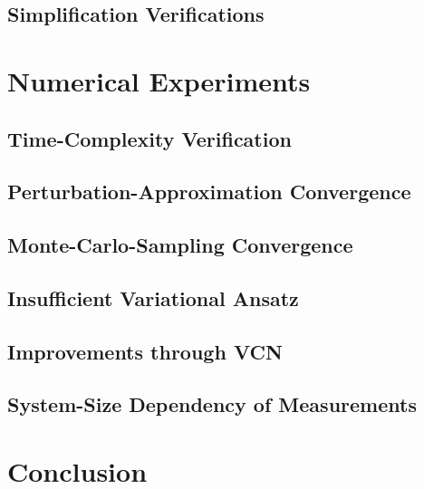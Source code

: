 \documentclass[
headings=optiontohead,              %
12pt,                               %
DIV=13,                             %
twoside=false,                      %
open=right,                         %
BCOR=00mm,                          %
toc=bibliographynumbered            %
]{scrreport}
\begin{document}
    \section{Simplification Verifications}
    \label{sec:implementation-details-simplification-verifications}
    
    \FloatBarrier

\chapter{Numerical Experiments}
\label{sec:experiments-numerical}

\FloatBarrier

    \section{Time-Complexity Verification}
    \label{sec:experiments-time-complexity}
    
    \FloatBarrier

    \section{Perturbation-Approximation Convergence}
    \label{sec:experiments-perturbation-convergence}
    
    \FloatBarrier

    \section{Monte-Carlo-Sampling Convergence}
    \label{sec:experiments-mc-convergence}
    
    \FloatBarrier

    \section{Insufficient Variational Ansatz}
    \label{sec:experiments-vcn-fails}
    
    \FloatBarrier
    
    \section{Improvements through VCN}
    \label{sec:experiments-vcn-successful}
    
    \FloatBarrier

    \section{System-Size Dependency of Measurements}
    \label{sec:experiments-size-dependency-measurement}
    
    \FloatBarrier

\chapter{Conclusion}
\label{sec:conclusion}

\FloatBarrier



\end{document}
